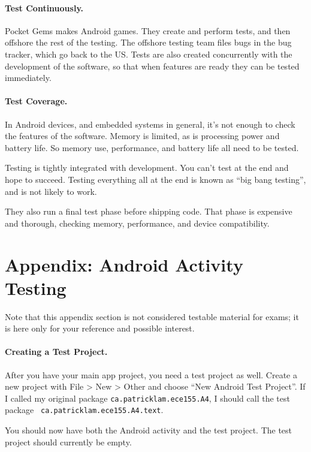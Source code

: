 \paragraph{Test Continuously.} Pocket Gems makes Android games. They create
and perform tests, and then offshore the rest of the testing. The offshore 
testing team files bugs in the bug tracker, which go back to the US. Tests are also created concurrently with the development of the software, so that when features are ready they can be tested immediately.

\paragraph{Test Coverage.} In Android devices, and embedded systems in general, it's not enough to check the features of the software. Memory is limited, as is processing power and battery life. So memory use, performance, and battery life all need to be tested.

Testing is tightly integrated with development. You can't test at the end
and hope to succeed. Testing everything all at the end is known as ``big bang testing'', and is not likely to work.

They also run a final test phase before shipping code. That phase is expensive
and thorough, checking memory, performance, and device compatibility.




\section*{Appendix: Android Activity Testing}

Note that this appendix section is not considered testable material for exams; it is here only for your reference and possible interest.

\paragraph{Creating a Test Project.} 
After you have your main app project, you need a test project as well.
Create a new project with File \textgreater\- New \textgreater\- Other
and choose ``New Android Test Project''. If I called my original package
{\tt ca.patricklam.ece155.A4}, I should call the test package {\tt
ca.patricklam.ece155.A4.text}.

You should now have both the Android activity and the test project. The
test project should currently be empty.

